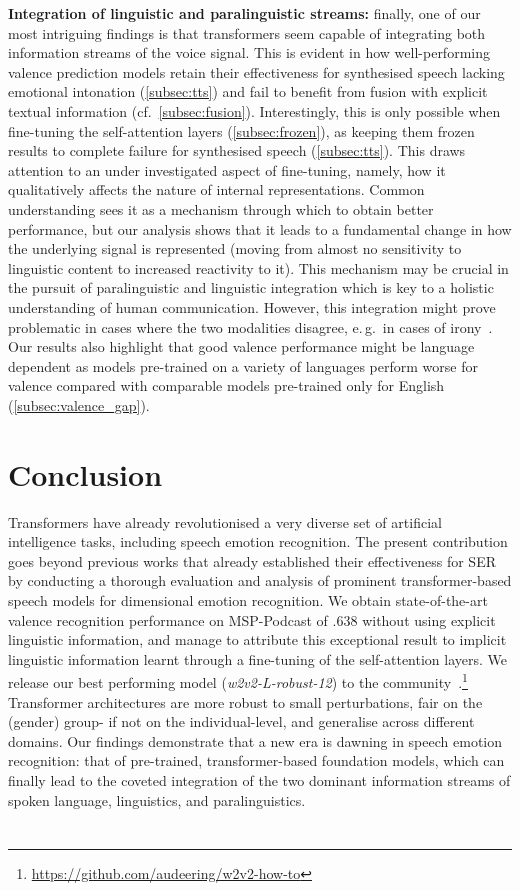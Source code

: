 \documentclass{article}
\newcommand\wrobustpruned{\mbox{\emph{w2v2-L-robust-12}}}
\newcommand\release{\mbox{\url{https://github.com/audeering/w2v2-how-to}}}
\newcommand\msppodcast{\mbox{MSP-Podcast}}
\newcommand{\eg}{e.\,g.\ }
\newcommand{\cf}{{cf.\ }}
\begin{document}
\textbf{Integration of linguistic and paralinguistic streams:}
finally, one of our most intriguing findings is that transformers seem capable of integrating both information streams of the voice signal.
This is evident in how well-performing valence prediction models
retain their effectiveness for synthesised speech lacking emotional intonation (\cref{subsec:tts})
and fail to benefit from fusion with explicit textual information (\cf \cref{subsec:fusion}).
Interestingly, this is only possible when fine-tuning the self-attention layers (\cref{subsec:frozen}),
as keeping them frozen results to complete failure for synthesised speech (\cref{subsec:tts}).
This draws attention to an under investigated aspect of fine-tuning,
namely, how it qualitatively affects the nature of internal representations.
Common understanding sees it as a mechanism through which to obtain better performance,
but our analysis shows that it leads to a fundamental change in how the underlying signal is represented (moving from almost no sensitivity to linguistic content to increased reactivity to it).
This mechanism may be crucial in the pursuit of paralinguistic and linguistic integration
which is key to a holistic understanding of human communication.
However, this integration might prove problematic in cases where the two modalities disagree,
\eg in cases of irony~\citep{burkhardt2017irony}.
Our results also highlight that good valence performance might be language dependent
as models pre-trained on a variety of languages perform worse for valence
compared with comparable models pre-trained only for English (\cref{subsec:valence_gap}).





\section{Conclusion}
\label{sec:conclusion}

Transformers have already revolutionised a very diverse set of artificial intelligence tasks,
including speech emotion recognition.
The present contribution goes beyond previous works
that already established their effectiveness for SER
by conducting a thorough evaluation and analysis of prominent transformer-based speech models
for dimensional emotion recognition.
We obtain state-of-the-art valence recognition performance on {\msppodcast} of $.638$
without using explicit linguistic information,
and manage to attribute this exceptional result
to implicit linguistic information
learnt through a fine-tuning of the self-attention layers.
We release our best performing model ({\wrobustpruned}) to the community~\citep{wagner2022model}.\footnote{{\release}}
Transformer architectures are more robust to small perturbations,
fair on the (gender) group- if not on the individual-level,
and generalise across different domains.
Our findings demonstrate that a new era is dawning in speech emotion recognition:
that of pre-trained, transformer-based foundation models,
which can finally lead to the coveted integration of the two dominant information streams of spoken language, linguistics, and paralinguistics.


\section{\refname}
\printbibliography[heading=none]
\end{document}
